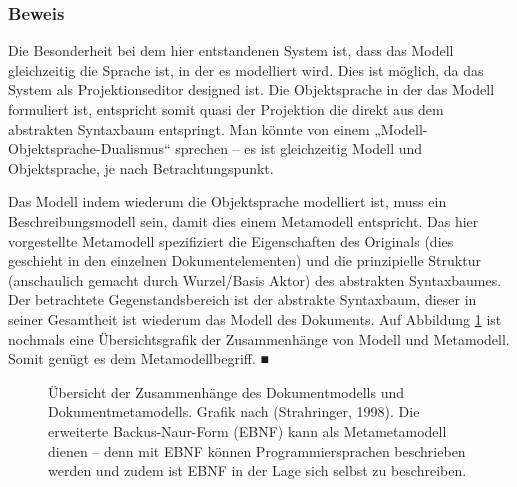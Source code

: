 \subsubsection{Beweis}\label{}

 
Die Besonderheit bei dem hier entstandenen System ist, dass das Modell gleichzeitig die Sprache ist, in der es modelliert wird. Dies ist möglich, da das System als Projektionseditor designed ist. Die Objektsprache in der das Modell formuliert ist, entspricht somit quasi der Projektion die direkt aus dem abstrakten Syntaxbaum entspringt. Man könnte von einem „Modell-Objektsprache-Dualismus“ sprechen -- es ist gleichzeitig Modell und Objektsprache, je nach Betrachtungspunkt.

 
Das Modell indem wiederum die Objektsprache modelliert ist, muss ein Beschreibungsmodell sein, damit dies einem Metamodell entspricht. Das hier vorgestellte Metamodell spezifiziert die Eigenschaften des Originals (dies geschieht in den einzelnen Dokumentelementen) und die prinzipielle Struktur (anschaulich gemacht durch Wurzel/Basis Aktor) des abstrakten Syntaxbaumes. Der betrachtete Gegenstandsbereich ist der abstrakte Syntaxbaum, dieser in seiner Gesamtheit ist wiederum das Modell des Dokuments. Auf Abbildung \ref{metamodellschema} ist nochmals eine Übersichtsgrafik der Zusammenhänge von Modell und Metamodell. Somit genügt es dem Metamodellbegriff. ■

 
\begin{figure}[h!]
\centering
\advance\leftskip-2.5cm
\caption{ Übersicht der Zusammenhänge des Dokumentmodells und Dokumentmetamodells. Grafik nach (Strahringer, 1998). Die erweiterte Backus-Naur-Form (EBNF) kann als Metametamodell dienen -- denn mit EBNF können Programmiersprachen beschrieben werden und zudem ist EBNF in der Lage sich selbst zu beschreiben. }\label{metamodellschema}
\end{figure}
 
